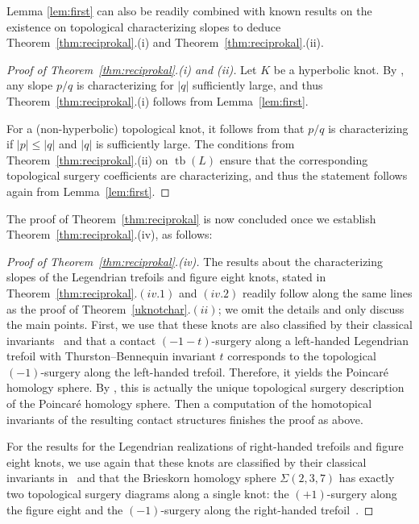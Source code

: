\documentclass[11pt]{amsart} %
\DeclareMathOperator{\tb}{tb}
\theoremstyle{plain}
\theoremstyle{definition}
\begin{document}
Lemma \ref{lem:first} can also be readily combined with known results on the existence on topological characterizing slopes to deduce Theorem~\ref{thm:reciprokal}.(i) and Theorem~\ref{thm:reciprokal}.(ii).

\begin{proof} [Proof of Theorem~\ref{thm:reciprokal}.(i) and (ii)]
	Let $K$ be a hyperbolic knot. By \cite{Lackenby19}, any slope $p/q$ is characterizing for $|q|$ sufficiently large, and thus Theorem~\ref{thm:reciprokal}.(i) follows from Lemma~\ref{lem:first}.
	
	For a (non-hyperbolic) topological knot, it follows from \cite{Lackenby19} that $p/q$ is characterizing if $|p|\leq|q|$ and $|q|$ is sufficiently large. The conditions from Theorem~\ref{thm:reciprokal}.(ii) on $\tb(L)$ ensure that the corresponding topological surgery coefficients are characterizing, and thus the statement follows again from Lemma~\ref{lem:first}.
\end{proof}

The proof of Theorem~\ref{thm:reciprokal} is now concluded once we establish Theorem~\ref{thm:reciprokal}.(iv), as follows:

\begin{proof}[Proof of Theorem~\ref{thm:reciprokal}.(iv)]
	The results about the characterizing slopes of the Legendrian trefoils and figure eight knots, stated in Theorem~\ref{thm:reciprokal}.$(iv.1)$ and $(iv.2)$ readily follow along the same lines as the proof of Theorem~\ref{uknotchar}.$(ii)$; we omit the details and only discuss the main points. First, we use that these knots are also classified by their classical invariants~\cite{EtnyreHonda01b} and that a contact $(-1-t)$-surgery along a left-handed Legendrian trefoil with Thurston--Bennequin invariant $t$ corresponds to the topological $(-1)$-surgery along the left-handed trefoil. Therefore, it yields the Poincar\'e homology sphere. By \cite{Ghiggini08b}, this is actually the unique topological surgery description of the Poincar\'e homology sphere. Then a computation of the homotopical invariants of the resulting contact structures finishes the proof as above. 
	
	For the results for the Legendrian realizations of right-handed trefoils and figure eight knots, we use again that these knots are classified by their classical invariants in~\cite{EtnyreHonda01b} and that the Brieskorn homology sphere $\Sigma(2,3,7)$ has exactly two topological surgery diagrams along a single knot: the $(+1)$-surgery along the figure eight and the $(-1)$-surgery along the right-handed trefoil~\cite{OzsvathSzabo19}. 
\end{proof}
\end{document}
